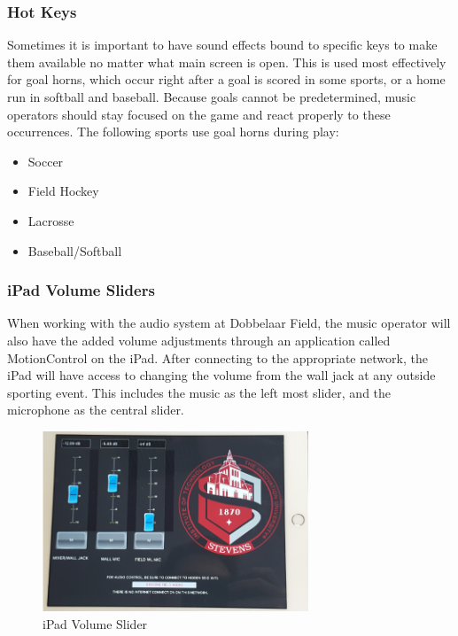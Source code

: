 \documentclass{article}
\begin{document}
\subsubsection{Hot Keys}
Sometimes it is important to have sound effects bound to specific keys to make them available no matter what main screen is open. This is used most effectively for goal horns, which occur right after a goal is scored in some sports, or a home run in softball and baseball. Because goals cannot be predetermined, music operators should stay focused on the game and react properly to these occurrences. 
\newline
The following sports use goal horns during play:
\begin{itemize}
    \item Soccer
    \item Field Hockey
    \item Lacrosse
    \item Baseball/Softball
\end{itemize}

\subsubsection{iPad Volume Sliders}
When working with the audio system at Dobbelaar Field, the music operator will also have the added volume adjustments through an application called MotionControl on the iPad. After connecting to the appropriate network, the iPad will have access to changing the volume from the wall jack at any outside sporting event. This includes the music as the left most slider, and the microphone as the central slider.

\begin{figure}[h]
\begin{center}
\includegraphics[width= 300px]{images/iPadVolume.png}
\caption{iPad Volume Slider}
\end{center}
\end{figure}
\end{document}
